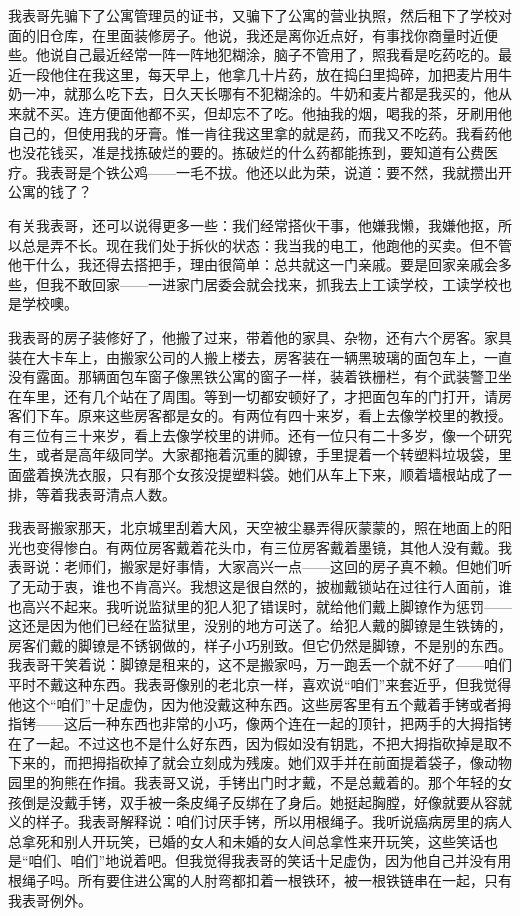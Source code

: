 我表哥先骗下了公寓管理员的证书，又骗下了公寓的营业执照，然后租下了学校对面的旧仓库，在里面装修房子。他说，我还是离你近点好，有事找你商量时近便些。他说自己最近经常一阵一阵地犯糊涂，脑子不管用了，照我看是吃药吃的。最近一段他住在我这里，每天早上，他拿几十片药，放在捣臼里捣碎，加把麦片用牛奶一冲，就那么吃下去，日久天长哪有不犯糊涂的。牛奶和麦片都是我买的，他从来就不买。连方便面他都不买，但却忘不了吃。他抽我的烟，喝我的茶，牙刷用他自己的，但使用我的牙膏。惟一肯往我这里拿的就是药，而我又不吃药。我看药他也没花钱买，准是找拣破烂的要的。拣破烂的什么药都能拣到，要知道有公费医疗。我表哥是个铁公鸡——一毛不拔。他还以此为荣，说道：要不然，我就攒出开公寓的钱了？ 

有关我表哥，还可以说得更多一些：我们经常搭伙干事，他嫌我懒，我嫌他抠，所以总是弄不长。现在我们处于拆伙的状态：我当我的电工，他跑他的买卖。但不管他干什么，我还得去搭把手，理由很简单：总共就这一门亲戚。要是回家亲戚会多些，但我不敢回家——一进家门居委会就会找来，抓我去上工读学校，工读学校也是学校噢。 



我表哥的房子装修好了，他搬了过来，带着他的家具、杂物，还有六个房客。家具装在大卡车上，由搬家公司的人搬上楼去，房客装在一辆黑玻璃的面包车上，一直没有露面。那辆面包车窗子像黑铁公寓的窗子一样，装着铁栅栏，有个武装警卫坐在车里，还有几个站在了周围。等到一切都安顿好了，才把面包车的门打开，请房客们下车。原来这些房客都是女的。有两位有四十来岁，看上去像学校里的教授。有三位有三十来岁，看上去像学校里的讲师。还有一位只有二十多岁，像一个研究生，或者是高年级同学。大家都拖着沉重的脚镣，手里提着一个转塑料垃圾袋，里面盛着换洗衣服，只有那个女孩没提塑料袋。她们从车上下来，顺着墙根站成了一排，等着我表哥清点人数。 

我表哥搬家那天，北京城里刮着大风，天空被尘暴弄得灰蒙蒙的，照在地面上的阳光也变得惨白。有两位房客戴着花头巾，有三位房客戴着墨镜，其他人没有戴。我表哥说：老师们，搬家是好事情，大家高兴一点——这回的房子真不赖。但她们听了无动于衷，谁也不肯高兴。我想这是很自然的，披枷戴锁站在过往行人面前，谁也高兴不起来。我听说监狱里的犯人犯了错误时，就给他们戴上脚镣作为惩罚——这还是因为他们已经在监狱里，没别的地方可送了。给犯人戴的脚镣是生铁铸的，房客们戴的脚镣是不锈钢做的，样子小巧别致。但它仍然是脚镣，不是别的东西。我表哥干笑着说：脚镣是租来的，这不是搬家吗，万一跑丢一个就不好了——咱们平时不戴这种东西。我表哥像别的老北京一样，喜欢说“咱们”来套近乎，但我觉得他这个“咱们”十足虚伪，因为他没戴这种东西。这些房客里有五个戴着手铐或者拇指铐——这后一种东西也非常的小巧，像两个连在一起的顶针，把两手的大拇指铐在了一起。不过这也不是什么好东西，因为假如没有钥匙，不把大拇指砍掉是取不下来的，而把拇指砍掉了就会立刻成为残废。她们双手并在前面提着袋子，像动物园里的狗熊在作揖。我表哥又说，手铐出门时才戴，不是总戴着的。那个年轻的女孩倒是没戴手铐，双手被一条皮绳子反绑在了身后。她挺起胸膛，好像就要从容就义的样子。我表哥解释说：咱们讨厌手铐，所以用根绳子。我听说癌病房里的病人总拿死和别人开玩笑，已婚的女人和未婚的女人间总拿性来开玩笑，这些笑话也是“咱们、咱们”地说着吧。但我觉得我表哥的笑话十足虚伪，因为他自己并没有用根绳子吗。所有要住进公寓的人肘弯都扣着一根铁环，被一根铁链串在一起，只有我表哥例外。 

